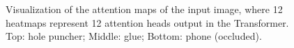 \documentclass[12pt,DIV14,BCOR12mm,a4paper,footinclude=false,headinclude,parskip=half-,twoside,openright,cleardoublepage=empty,toc=index,bibliography=totoc,listof=totoc]{scrreprt}
\numberwithin{equation}{chapter}
\begin{document}
\begin{figure}[h]
  \centering
   \\
  \centering
   \\
  \centering
  \caption{Visualization of the attention maps of the input image, where 12 heatmaps represent 12 attention heads output in the Transformer. Top: hole puncher; Middle: glue; Bottom: phone (occluded).}
  \label{img:atten}
\end{figure}
\end{document}
